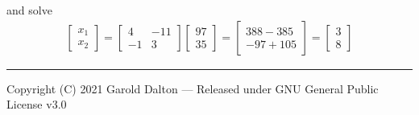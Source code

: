 \documentclass[14pt]{extarticle}
\begin{document}
and solve
\begin{align*}
	\begin{bmatrix}
		x_1 \\
		x_2
	\end{bmatrix}
	= \begin{bmatrix}
		4 & -11 \\
		-1 & 3
	\end{bmatrix}\begin{bmatrix} 97 \\ 35 \end{bmatrix}
	= \begin{bmatrix} 388-385 \\ -97+105 \end{bmatrix}
	= \begin{bmatrix} 3 \\ 8 \end{bmatrix}
\end{align*}


\noindent\rule{\textwidth}{1pt}
{\footnotesize Copyright (C) 2021 Garold Dalton --- Released under GNU General Public License v3.0}
\end{document}
